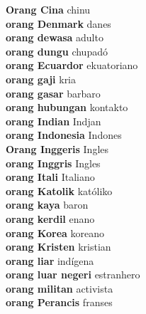 \textbf{ Orang Cina  } chinu \\
\textbf{ orang Denmark  } danes \\
\textbf{ orang dewasa  } adulto \\
\textbf{ orang dungu  } chupadó \\
\textbf{ orang Ecuardor  } ekuatoriano \\
\textbf{ orang gaji  } kria \\
\textbf{ orang gasar  } barbaro \\
\textbf{ orang hubungan  } kontakto \\
\textbf{ orang Indian  } Indjan \\
\textbf{ orang Indonesia  } Indones \\
\textbf{ Orang Inggeris  } Ingles \\
\textbf{ orang Inggris  } Ingles \\
\textbf{ orang Itali  } Italiano \\
\textbf{ orang Katolik  } katóliko \\
\textbf{ orang kaya  } baron \\
\textbf{ orang kerdil  } enano \\
\textbf{ orang Korea  } koreano \\
\textbf{ orang Kristen  } kristian \\
\textbf{ orang liar  } indígena \\
\textbf{ orang luar negeri  } estranhero \\
\textbf{ orang militan  } activista \\
\textbf{ orang Perancis  } franses \\
